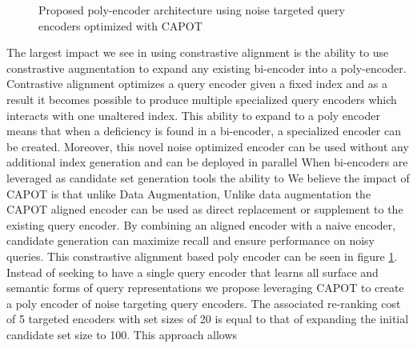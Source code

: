 \begin{figure}[htb!]
    \centering
    \caption{Proposed poly-encoder architecture using noise targeted query encoders optimized with CAPOT}
    \label{fig:capot-fig2}
\end{figure}
The largest impact we see in using constrastive alignment is the ability to use constrastive augmentation to expand any existing bi-encoder into a poly-encoder. Contrastive alignment optimizes a query encoder given a fixed index and as a result it becomes possible to produce multiple specialized query encoders which interacts with one unaltered index. This ability to expand to a poly encoder means that when a deficiency is found in a bi-encoder, a specialized encoder can be created. Moreover, this novel noise optimized encoder can be used without any additional index generation and can be deployed in parallel  When bi-encoders are leveraged as candidate set generation tools the ability to   We believe the impact of CAPOT is that unlike Data Augmentation, Unlike data augmentation the CAPOT aligned encoder can be used as direct replacement or supplement to the existing query encoder. By combining an aligned encoder with a naive encoder, candidate generation can maximize recall and ensure performance on noisy queries. This constrastive alignment based poly encoder can be seen in figure \ref{fig:capot-fig2}. Instead of seeking to have a single query encoder that learns all surface and semantic forms of query representations we propose leveraging CAPOT to create a poly encoder of noise targeting query encoders. The associated re-ranking cost of 5 targeted encoders with set sizes of 20 is equal to that of expanding the initial candidate set size to 100. This approach allows 
